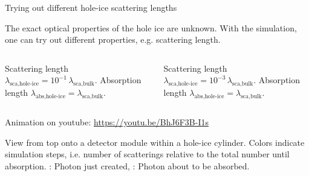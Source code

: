 
\begin{frame}[fragile]{Trying out different hole-ice scattering lengths}

  The exact optical properties of the hole ice are unknown. With the simulation, one can try out different properties, e.g. scattering length.
  \vspace{1cm}
  \begin{columns}
    \begin{column}{0.5\textwidth}

      \small
      Scattering length $\lambda_\text{sca,hole-ice} = 10^{-1}\, \lambda_\text{sca,bulk}$.
      Absorption length $\lambda_\text{abs,hole-ice} = \lambda_\text{sca,bulk}$.

    \end{column}
    \begin{column}{0.5\textwidth}

      \small
      Scattering length $\lambda_\text{sca,hole-ice} = 10^{-3}\, \lambda_\text{sca,bulk}$.
      Absorption length $\lambda_\text{abs,hole-ice} = \lambda_\text{sca,bulk}$.

    \end{column}
  \end{columns}

  \vspace{0.7cm}
  \small
  Animation on youtube: \url{https://youtu.be/BhJ6F3B-I1s}

  \tiny{View from top onto a detector module within a hole-ice cylinder. Colors indicate simulation steps, i.e. number of scatterings relative to the total number until absorption. \color{red}{Red}: Photon just created, \color{blue}{blue}: Photon about to be absorbed.}


\end{frame}

